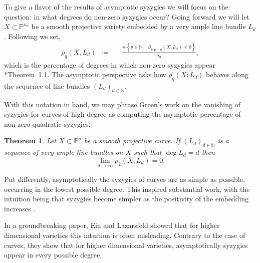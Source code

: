 \documentclass[11pt,reqno]{amsart}
\newtheorem{theorem}[lemma]{Theorem}
\theoremstyle{remark}
\newcommand{\N}{\mathbb{N}}
\renewcommand{\P}{\mathbb{P}}
\begin{document}
To give a flavor of the results of asymptotic syzygies we will focus on the question: in what degrees do non-zero syzygies occur? Going forward we will let $X\subset \P^{n_{d}}$ be a smooth projective variety embedded by a very ample line bundle $L_{d}$. Following \cite{ermanYang18} we set, 
\begin{align*}
\rho_q\left(X,L_{d}\right)\;\;\coloneqq&\ \;\; \frac{\#\left\{p\in\N |\; \big| \; \beta_{p,p+q}\left(X,L_{d}\right)\neq0\right\}}{n_{d}},
\end{align*}
which is the percentage of degrees in which non-zero syzygies appear \cite{eisenbud05}*{Theorem~1.1}. The asymptotic perspective asks how $\rho_{q}(X;L_{d})$ behaves along the sequence of line bundles $(L_{d})_{d\in \N}$. 

With this notation in hand, we may phrase Green's work on the vanishing of syzygies for curves of high degree as computing the asymptotic percentage of non-zero quadratic syzygies. 

\begin{theorem}\cite{green84-I}
Let $X\subset \P^n$ be a smooth projective curve. If $(L_{d})_{d\in\N}$ is a sequence of very ample line bundles on $X$ such that $\deg L_{d} = d$ then 
\[
\lim_{d\to \infty} \rho_{2}\left(X;L_{d}\right) = 0.
\]
\end{theorem}

Put differently, asymptotically the syzygies of curves are as simple as possible, occurring in the lowest possible degree. This inspired substantial work, with the intuition being that syzygies become simpler as the positivity of the embedding increases \cite{ottavianiPaoletti01, einLazarsfeld93, lazarsfeldPareschiPopa11, pareschi00, pareschiPopa03, pareschiPopa04}.  

In a groundbreaking paper, Ein and Lazarsfeld showed that for higher dimensional varieties this intuition is often misleading. Contrary to the case of curves, they show that for higher dimensional varieties, asymptotically syzygies appear in every possible degree. 
  
\end{document}
